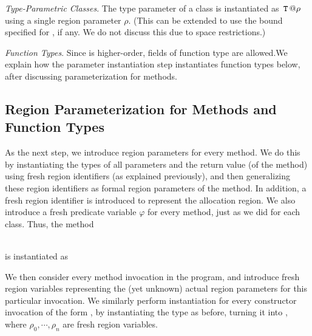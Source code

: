 \emph{Type-Parametric Classes}.
The type parameter  of a class  is instantiated as $\,{\tt T}\,@\rho$ using a single region parameter $\rho$. 
(This can be extended to use the bound specified for , if any. We do not
discuss this due to space restrictions.)

\emph{Function Types}.
Since \FB{} is higher-order, fields of function type are allowed.We explain how the parameter instantiation step
instantiates function types below, after discussing parameterization for methods.




\subsection{Region Parameterization for Methods and Function Types}

As the next step, we introduce region parameters for every method.
We do this by instantiating the types of all parameters and the
return value (of the method) using fresh region identifiers (as explained previously),
and then generalizing these region identifiers as formal region parameters
of the method. In addition, a fresh region identifier is introduced to represent the
allocation region.
We also introduce a fresh predicate variable $\varphi$ for every method,
just as we did for each class.
Thus, the method

 \\
is instantiated as


We then consider every method invocation in the program, and introduce
fresh region variables representing the (yet unknown) actual region
parameters for this particular invocation.
%
We similarly perform instantiation for every constructor invocation
of the form , by instantiating the type  as
before, turning it into ,
where $\rho_0, \cdots, \rho_n$ are fresh region variables.

